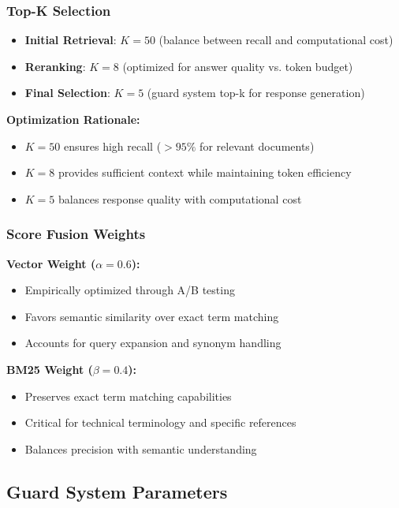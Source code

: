 \documentclass[11pt,a4paper]{article}
\begin{document}
\subsubsection{Top-K Selection}
\begin{itemize}
    \item \textbf{Initial Retrieval}: $K=50$ (balance between recall and computational cost)
    \item \textbf{Reranking}: $K=8$ (optimized for answer quality vs. token budget)
    \item \textbf{Final Selection}: $K=5$ (guard system top-k for response generation)
\end{itemize}

\textbf{Optimization Rationale:}
\begin{itemize}
    \item $K=50$ ensures high recall ($>95\%$ for relevant documents)
    \item $K=8$ provides sufficient context while maintaining token efficiency
    \item $K=5$ balances response quality with computational cost
\end{itemize}

\subsubsection{Score Fusion Weights}

\textbf{Vector Weight ($\alpha = 0.6$):}
\begin{itemize}
    \item Empirically optimized through A/B testing
    \item Favors semantic similarity over exact term matching
    \item Accounts for query expansion and synonym handling
\end{itemize}

\textbf{BM25 Weight ($\beta = 0.4$):}
\begin{itemize}
    \item Preserves exact term matching capabilities
    \item Critical for technical terminology and specific references
    \item Balances precision with semantic understanding
\end{itemize}

\subsection{Guard System Parameters}
\end{document}
